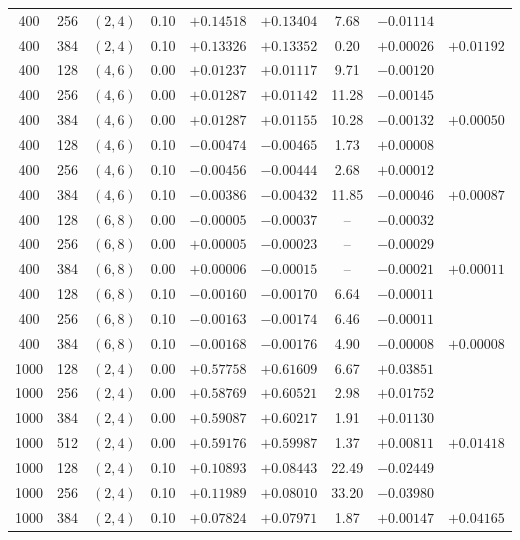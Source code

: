 \begin{table}[!htbp]
\begin{tabular}{@{}ccccccccc@{}}
400  & 256 & $(2,4)$ & 0.10 & $+0.14518$ & $+0.13404$ &  7.68 & $-0.01114$ &  \\
400  & 384 & $(2,4)$ & 0.10 & $+0.13326$ & $+0.13352$ &  0.20 & $+0.00026$ & $+0.01192$ \\
\hline
400  & 128 & $(4,6)$ & 0.00 & $+0.01237$ & $+0.01117$ &  9.71 & $-0.00120$ &  \\
400  & 256 & $(4,6)$ & 0.00 & $+0.01287$ & $+0.01142$ & 11.28 & $-0.00145$ &  \\
400  & 384 & $(4,6)$ & 0.00 & $+0.01287$ & $+0.01155$ & 10.28 & $-0.00132$ & $+0.00050$ \\
\hline
400  & 128 & $(4,6)$ & 0.10 & $-0.00474$ & $-0.00465$ &  1.73 & $+0.00008$ &  \\
400  & 256 & $(4,6)$ & 0.10 & $-0.00456$ & $-0.00444$ &  2.68 & $+0.00012$ &  \\
400  & 384 & $(4,6)$ & 0.10 & $-0.00386$ & $-0.00432$ & 11.85 & $-0.00046$ & $+0.00087$ \\
\hline
400  & 128 & $(6,8)$ & 0.00 & $-0.00005$ & $-0.00037$ & -- & $-0.00032$ &  \\
400  & 256 & $(6,8)$ & 0.00 & $+0.00005$ & $-0.00023$ & -- & $-0.00029$ &  \\
400  & 384 & $(6,8)$ & 0.00 & $+0.00006$ & $-0.00015$ & -- & $-0.00021$ & $+0.00011$ \\
\hline
400  & 128 & $(6,8)$ & 0.10 & $-0.00160$ & $-0.00170$ &  6.64 & $-0.00011$ &  \\
400  & 256 & $(6,8)$ & 0.10 & $-0.00163$ & $-0.00174$ &  6.46 & $-0.00011$ &  \\
400  & 384 & $(6,8)$ & 0.10 & $-0.00168$ & $-0.00176$ &  4.90 & $-0.00008$ & $+0.00008$ \\
\hline
1000 & 128 & $(2,4)$ & 0.00 & $+0.57758$ & $+0.61609$ &  6.67 & $+0.03851$ &  \\
1000 & 256 & $(2,4)$ & 0.00 & $+0.58769$ & $+0.60521$ &  2.98 & $+0.01752$ &  \\
1000 & 384 & $(2,4)$ & 0.00 & $+0.59087$ & $+0.60217$ &  1.91 & $+0.01130$ &  \\
1000 & 512 & $(2,4)$ & 0.00 & $+0.59176$ & $+0.59987$ &  1.37 & $+0.00811$ & $+0.01418$ \\
\hline
1000 & 128 & $(2,4)$ & 0.10 & $+0.10893$ & $+0.08443$ & 22.49 & $-0.02449$ &  \\
1000 & 256 & $(2,4)$ & 0.10 & $+0.11989$ & $+0.08010$ & 33.20 & $-0.03980$ &  \\
1000 & 384 & $(2,4)$ & 0.10 & $+0.07824$ & $+0.07971$ &  1.87 & $+0.00147$ & $+0.04165$ \\

\end{tabular}
\end{table}
